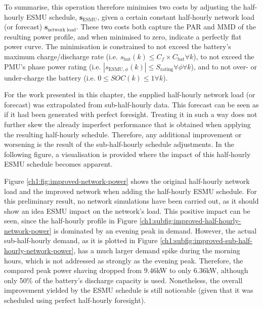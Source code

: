 

To summarise, this operation therefore minimises two costs by adjusting the half-hourly ESMU schedule, $\textbf{s}_\text{ESMU}$, given a certain constant half-hourly network load (or forecast) $\textbf{s}_\text{network load}$.
These two costs both capture the PAR and MMD of the resulting power profile, and when minimised to zero, indicate a perfectly flat power curve.
The minimisation is constrained to not exceed the battery's maximum charge/discharge rate (i.e. $s_\text{bat}(k) \leq C_f \times C_\text{bat} \forall k$), to not exceed the PMU's phase power rating (i.e. $\left|s_{\text{ESMU},\phi}(k)\right| \leq S_\text{rating} \forall \phi \forall k$), and to not over- or under-charge the battery (i.e. $0 \leq SOC(k) \leq 1 \forall k$).

For the work presented in this chapter, the supplied half-hourly network load (or forecast) was extrapolated from sub-half-hourly data.
This forecast can be seen as if it had been generated with perfect foresight.
Treating it in such a way does not further skew the already imperfect performance that is obtained when applying the resulting half-hourly schedule.
Therefore, any additional improvement or worsening is the result of the sub-half-hourly schedule adjustments.
In the following figure, a visualisation is provided where the impact of this half-hourly ESMU schedule becomes apparent.



Figure \ref{ch1:fig:improved-network-power} shows the original half-hourly network load and the improved network when adding the half-hourly ESMU schedule.
For this preliminary result, no network simulations have been carried out, as it should show an idea ESMU impact on the network's load.
This positive impact can be seen, since the half-hourly profile in Figure \ref{ch1:subfig:improved-half-hourly-network-power} is dominated by an evening peak in demand.
However, the actual sub-half-hourly demand, as it is plotted in Figure \ref{ch1:subfig:improved-sub-half-hourly-network-power}, has a much larger demand spike during the morning hours, which is not addressed as strongly as the evening peak.
Therefore, the compared peak power shaving dropped from 9.46kW to only 6.36kW, although only 50\% of the battery's discharge capacity is used.
Nonetheless, the overall improvement yielded by the ESMU schedule is still noticeable (given that it was scheduled using perfect half-hourly foresight). 


